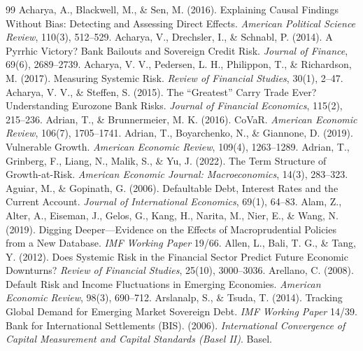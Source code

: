 \begin{thebibliography}{99}
\sloppy\small
{} Acharya, A., Blackwell, M., \& Sen, M. (2016). Explaining Causal Findings Without Bias: Detecting and Assessing Direct Effects. \textit{American Political Science Review}, 110(3), 512--529.
 Acharya, V., Drechsler, I., \& Schnabl, P. (2014). A Pyrrhic Victory? Bank Bailouts and Sovereign Credit Risk. \textit{Journal of Finance}, 69(6), 2689--2739.
 Acharya, V. V., Pedersen, L. H., Philippon, T., \& Richardson, M. (2017). Measuring Systemic Risk. \textit{Review of Financial Studies}, 30(1), 2--47.
 Acharya, V. V., \& Steffen, S. (2015). The ``Greatest'' Carry Trade Ever? Understanding Eurozone Bank Risks. \textit{Journal of Financial Economics}, 115(2), 215--236.
 Adrian, T., \& Brunnermeier, M. K. (2016). CoVaR. \textit{American Economic Review}, 106(7), 1705--1741.
 Adrian, T., Boyarchenko, N., \& Giannone, D. (2019). Vulnerable Growth. \textit{American Economic Review}, 109(4), 1263--1289.
 Adrian, T., Grinberg, F., Liang, N., Malik, S., \& Yu, J. (2022). The Term Structure of Growth-at-Risk. \textit{American Economic Journal: Macroeconomics}, 14(3), 283--323.
 Aguiar, M., \& Gopinath, G. (2006). Defaultable Debt, Interest Rates and the Current Account. \textit{Journal of International Economics}, 69(1), 64--83.
 Alam, Z., Alter, A., Eiseman, J., Gelos, G., Kang, H., Narita, M., Nier, E., \& Wang, N. (2019). Digging Deeper---Evidence on the Effects of Macroprudential Policies from a New Database. \textit{IMF Working Paper} 19/66.
 Allen, L., Bali, T. G., \& Tang, Y. (2012). Does Systemic Risk in the Financial Sector Predict Future Economic Downturns? \textit{Review of Financial Studies}, 25(10), 3000--3036.
 Arellano, C. (2008). Default Risk and Income Fluctuations in Emerging Economies. \textit{American Economic Review}, 98(3), 690--712.
 Arslanalp, S., \& Tsuda, T. (2014). Tracking Global Demand for Emerging Market Sovereign Debt. \textit{IMF Working Paper} 14/39.
 Bank for International Settlements (BIS). (2006). \textit{International Convergence of Capital Measurement and Capital Standards (Basel II)}. Basel.

\end{thebibliography}
